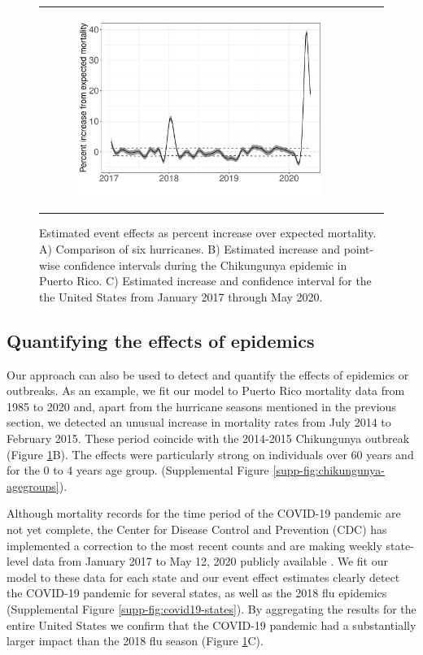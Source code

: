 \documentclass[11pt]{article}
\begin{document}
\begin{figure}[ht]
\begin{tabular}{lll}
\begin{subfigure}[t]{0.30\linewidth}
		\includegraphics[width=1\linewidth]{figs/figure-1c.pdf}
	\end{subfigure}\\
    \end{tabular}
    \caption{Estimated event effects as percent increase over expected mortality. A) Comparison of six hurricanes. B) Estimated increase and point-wise confidence intervals  during the Chikungunya epidemic in Puerto Rico. C) Estimated increase and confidence interval for the the United States from January 2017 through May 2020.}
    \label{fig:fhat-estimates}
\end{figure}

\subsection{Quantifying the effects of epidemics}
\label{subsec:epidemics}
Our approach can also be used to detect and quantify the effects of epidemics or outbreaks. As an example, we fit our model to Puerto Rico mortality data from 1985 to 2020 and, apart from the hurricane seasons mentioned in the previous section, we detected an unusual increase in mortality rates from July 2014 to February 2015. These period coincide with the 2014-2015 Chikungunya outbreak \cite{sharp2016surveillance, hsu2019risk}  (Figure \ref{fig:fhat-estimates}B). The effects were particularly strong on individuals over 60 years and for the 0 to 4 years age group. (Supplemental Figure  \ref{supp-fig:chikungunya-agegroups}).

Although mortality records for the time period of the COVID-19 pandemic are not yet complete, the Center for Disease Control and Prevention (CDC) has implemented a correction to the most recent counts and are making weekly state-level data from January 2017 to May 12, 2020 publicly available \cite{cdc2020covid19}. We fit our model to these data for each state and our event effect estimates clearly detect the COVID-19 pandemic for several states, as well as the 2018 flu epidemics (Supplemental Figure \ref{supp-fig:covid19-states}). By aggregating the results for the entire United States we confirm that the COVID-19 pandemic had a substantially larger impact than the 2018 flu season
(Figure \ref{fig:fhat-estimates}C).
 
\end{document}
